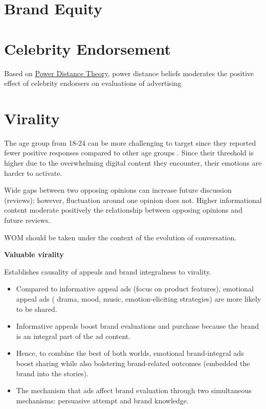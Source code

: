 \documentclass[
]{book}
\providecommand{\tightlist}{%
  \setlength{\itemsep}{0pt}\setlength{\parskip}{0pt}}
\begin{document}
\hypertarget{brand-equity}{%
\chapter{Brand Equity}\label{brand-equity}}

\hypertarget{celebrity-endorsement}{%
\chapter{Celebrity Endorsement}\label{celebrity-endorsement}}

Based on \href{https://bookdown.org/mike/social-theory/power-distance-theory.html}{Power Distance Theory}, power distance beliefs moderates the positive effect of celebrity endorsers on evaluations of advertising \citep{Winterich_2018}

\hypertarget{virality}{%
\chapter{Virality}\label{virality}}

The age group from 18-24 can be more challenging to target since they reported fewer positive responses compared to other age groups \citep{Libert_2014}. Since their threshold is higher due to the overwhelming digital content they encounter, their emotions are harder to activate.

Wide gaps between two opposing opinions can increase future discussion (reviews); however, fluctuation around one opinion does not. Higher informational content moderate positively the relationship between opposing opinions and future reviews. \citep{Nagle_2014}

WOM should be taken under the context of the evolution of conversation. \citep{Berger_2014}

\textbf{Valuable virality} \citep{Akpinar_2017}

Establishes causality of appeals and brand integralness to virality.

\begin{itemize}
\tightlist
\item
  Compared to informative appeal ads (focus on product features), emotional appeal ads ( drama, mood, music, emotion-eliciting strategies) are more likely to be shared.\\
\item
  Informative appeals boost brand evaluations and purchase because the brand is an integral part of the ad content.\\
\item
  Hence, to combine the best of both worlds, emotional brand-integral ads boost sharing while also bolstering brand-related outcomes (embedded the brand into the stories).\\
\item
  The mechanism that ads affect brand evaluation through two simultaneous mechanisms: persuasive attempt and brand knowledge.
\end{itemize}
\end{document}

